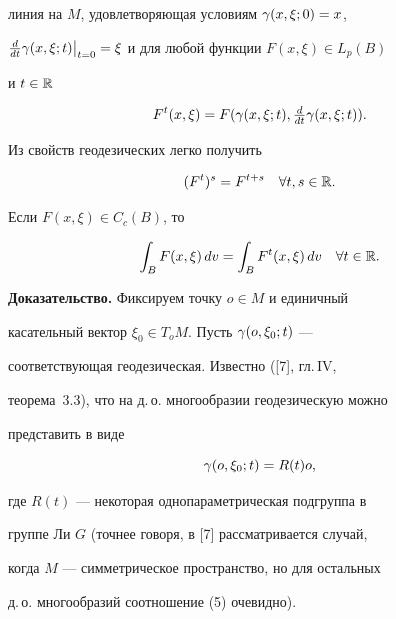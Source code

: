 линия на $M$, удовлетворяющая условиям $\gamma(x,\xi;0)=x$,


$\frac d{dt}\ga(x,\xi;t)\big|_{t=0}=


\xi$ и для любой функции $F(x,\xi)\in L_p(B)$


и $t\in\Bbb R$


$$


F^t(x,\xi)=F(\ga(x,\xi;t),\tfrac d{dt}\ga(x,\xi;t)).


$$


Из свойств геодезических легко получить


\begin{equation}


(F^t)^s=F^{t+s}\quad\forall t,s\in\Ra.


\end{equation}





\begin{lem}


Если $F(x,\xi)\in C_c(B)$, то


$$


\int_B F(x,\xi)\,dv=\int_B F^t(x,\xi)\,dv\quad


\forall t\in\Ra.


$$


\end{lem}





{\bf Доказательство.} Фиксируем точку $o\in M$ и единичный


касательный вектор $\xi_0\in T_oM$. Пусть $\gamma(o,\xi_0;t)$ ---


соответствующая геодезическая. Известно ([7], гл.\,IV,


теорема~3.3), что на д.\,о. многообразии геодезическую можно


представить в виде


\begin{equation}


\ga(o,\xi_0;t)=R(t)o,


\end{equation}


где $R(t)$ --- некоторая однопараметрическая подгруппа в


группе Ли $G$ (точнее говоря, в [7] рассматривается случай,


когда $M$ --- симметрическое пространство, но для остальных


д.\,о. многообразий соотношение (5) очевидно).





